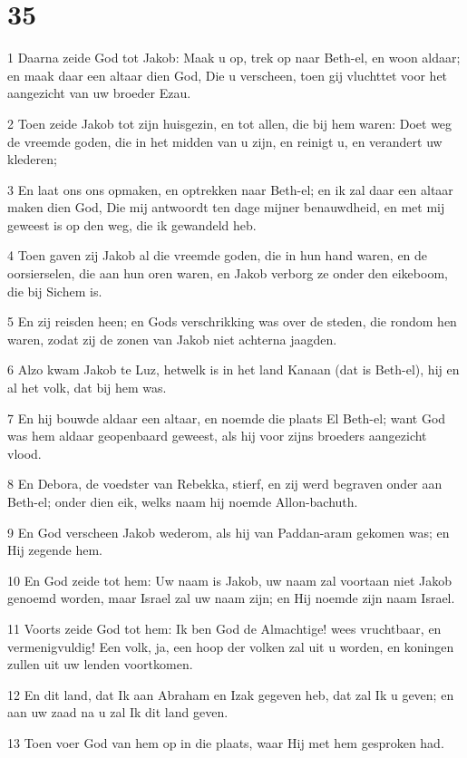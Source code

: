 \chapter{35}

\par 1 Daarna zeide God tot Jakob: Maak u op, trek op naar Beth-el, en woon aldaar; en maak daar een altaar dien God, Die u verscheen, toen gij vluchttet voor het aangezicht van uw broeder Ezau.
\par 2 Toen zeide Jakob tot zijn huisgezin, en tot allen, die bij hem waren: Doet weg de vreemde goden, die in het midden van u zijn, en reinigt u, en verandert uw klederen;
\par 3 En laat ons ons opmaken, en optrekken naar Beth-el; en ik zal daar een altaar maken dien God, Die mij antwoordt ten dage mijner benauwdheid, en met mij geweest is op den weg, die ik gewandeld heb.
\par 4 Toen gaven zij Jakob al die vreemde goden, die in hun hand waren, en de oorsierselen, die aan hun oren waren, en Jakob verborg ze onder den eikeboom, die bij Sichem is.
\par 5 En zij reisden heen; en Gods verschrikking was over de steden, die rondom hen waren, zodat zij de zonen van Jakob niet achterna jaagden.
\par 6 Alzo kwam Jakob te Luz, hetwelk is in het land Kanaan (dat is Beth-el), hij en al het volk, dat bij hem was.
\par 7 En hij bouwde aldaar een altaar, en noemde die plaats El Beth-el; want God was hem aldaar geopenbaard geweest, als hij voor zijns broeders aangezicht vlood.
\par 8 En Debora, de voedster van Rebekka, stierf, en zij werd begraven onder aan Beth-el; onder dien eik, welks naam hij noemde Allon-bachuth.
\par 9 En God verscheen Jakob wederom, als hij van Paddan-aram gekomen was; en Hij zegende hem.
\par 10 En God zeide tot hem: Uw naam is Jakob, uw naam zal voortaan niet Jakob genoemd worden, maar Israel zal uw naam zijn; en Hij noemde zijn naam Israel.
\par 11 Voorts zeide God tot hem: Ik ben God de Almachtige! wees vruchtbaar, en vermenigvuldig! Een volk, ja, een hoop der volken zal uit u worden, en koningen zullen uit uw lenden voortkomen.
\par 12 En dit land, dat Ik aan Abraham en Izak gegeven heb, dat zal Ik u geven; en aan uw zaad na u zal Ik dit land geven.
\par 13 Toen voer God van hem op in die plaats, waar Hij met hem gesproken had.
